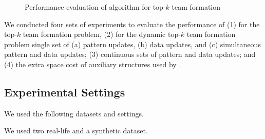 \begin{figure}[tb!]
\begin{center}
\hspace{0.2ex}
\vspace{-2.0ex}
\end{center}

\vspace{-3ex}
\caption{Performance evaluation of algorithm \optgrouprec for top-$k$ team formation}
\label{exp-semantic-effectiveness-citation}
\vspace{-3.0ex}
\end{figure}

We conducted four sets of experiments to evaluate the performance of
(1) \optgrouprec for the top-$k$ team formation problem,
(2) \inc for the dynamic top-$k$ team formation problem
\wrt single set of (a) pattern updates, (b) data updates, and (c) simultaneous pattern and data updates;
(3) \inc \wrt continuous sets of pattern and data updates; and
(4) the extra space cost of auxiliary structures used by \inc.


\subsection{Experimental Settings}

 We used the following datasets and settings.

\vspace{-0.3ex}
 We used two real-life and a synthetic dataset.

